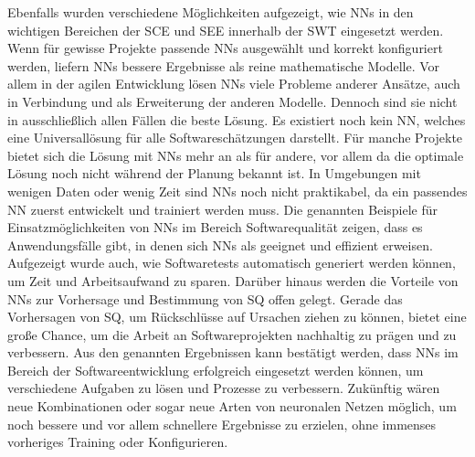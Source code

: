 Ebenfalls wurden verschiedene Möglichkeiten aufgezeigt, wie NNs in den wichtigen Bereichen der SCE und SEE innerhalb der SWT eingesetzt werden. Wenn für gewisse Projekte passende NNs ausgewählt und korrekt konfiguriert werden, liefern NNs bessere Ergebnisse als reine mathematische Modelle. Vor allem in der agilen Entwicklung lösen NNs viele Probleme anderer Ansätze, auch in Verbindung und als Erweiterung der anderen Modelle.
Dennoch sind sie nicht in ausschließlich allen Fällen die beste Lösung. Es existiert noch kein NN, welches eine Universallösung für alle Softwareschätzungen darstellt. Für manche Projekte bietet sich die Lösung mit NNs mehr an als für andere, vor allem da die optimale Lösung noch nicht während der Planung bekannt ist. In Umgebungen mit wenigen Daten oder wenig Zeit sind NNs noch nicht praktikabel, da ein passendes NN zuerst entwickelt und trainiert werden muss.
Die genannten Beispiele für Einsatzmöglichkeiten von NNs im Bereich Softwarequalität zeigen, dass es Anwendungsfälle gibt, in denen sich NNs als geeignet und effizient erweisen. Aufgezeigt wurde auch, wie Softwaretests automatisch generiert werden können, um Zeit und Arbeitsaufwand zu sparen. Darüber hinaus werden die Vorteile von NNs zur Vorhersage und Bestimmung von SQ offen gelegt. Gerade das Vorhersagen von SQ, um Rückschlüsse auf Ursachen ziehen zu können, bietet eine große Chance, um die Arbeit an Softwareprojekten nachhaltig zu prägen und zu verbessern. Aus den genannten Ergebnissen kann bestätigt werden, dass NNs im Bereich der Softwareentwicklung erfolgreich eingesetzt werden können, um verschiedene Aufgaben zu lösen und Prozesse zu verbessern.
Zukünftig wären neue Kombinationen oder sogar neue Arten von neuronalen Netzen möglich, um noch bessere und vor allem schnellere Ergebnisse zu erzielen, ohne immenses vorheriges Training oder Konfigurieren.
